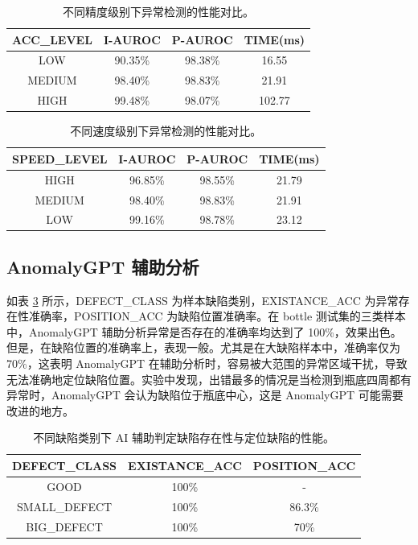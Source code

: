 \documentclass[
  ]{njuthesis}
\begin{document}
\begin{table}[H]
    \centering
    \caption{不同精度级别下异常检测的性能对比。}
    \label{acc_level_comparison}
    \renewcommand\arraystretch{0.5}
    \begin{tabular}{c|c|c|c}
    \toprule[1.5pt]
    ACC\_LEVEL & I-AUROC & P-AUROC & TIME(ms) \\
    \midrule[1pt]
    LOW & 90.35\% & 98.38\% & 16.55 \\
    \midrule[0.5pt]
    MEDIUM & 98.40\% & 98.83\% & 21.91 \\
    \midrule[0.5pt]
    HIGH & 99.48\% & 98.07\% & 102.77 \\
    \bottomrule[1.5pt]
    \end{tabular}
\end{table}

\begin{table}[H]
    \centering
    \caption{不同速度级别下异常检测的性能对比。}
    \label{speed_level_comparison}
    \renewcommand\arraystretch{0.5}
    \begin{tabular}{c|c|c|c}
    \toprule[1.5pt]
    SPEED\_LEVEL & I-AUROC & P-AUROC & TIME(ms) \\
    \midrule[1pt]
    HIGH & 96.85\% & 98.55\% & 21.79 \\
    \midrule[0.5pt]
    MEDIUM & 98.40\% & 98.83\% & 21.91 \\
    \midrule[0.5pt]
    LOW & 99.16\% & 98.78\% & 23.12 \\
    \bottomrule[1.5pt]
    \end{tabular}
\end{table}


\subsection{AnomalyGPT 辅助分析}

如表 \ref{AI_detection_accuracy} 所示，DEFECT\_CLASS 为样本缺陷类别，EXISTANCE\_ACC 为异常存在性准确率，POSITION\_ACC 为缺陷位置准确率。在 bottle 测试集的三类样本中，AnomalyGPT 辅助分析异常是否存在的准确率均达到了 100\%，效果出色。但是，在缺陷位置的准确率上，表现一般。尤其是在大缺陷样本中，准确率仅为 70\%，这表明 AnomalyGPT 在辅助分析时，容易被大范围的异常区域干扰，导致无法准确地定位缺陷位置。实验中发现，出错最多的情况是当检测到瓶底四周都有异常时，AnomalyGPT 会认为缺陷位于瓶底中心，这是 AnomalyGPT 可能需要改进的地方。

\begin{table}[H]
    \centering
    \caption{不同缺陷类别下 AI 辅助判定缺陷存在性与定位缺陷的性能。}
    \label{AI_detection_accuracy}
    \renewcommand\arraystretch{0.5}
    \begin{tabular}{c|c|c}
    \toprule[1.5pt]
    DEFECT\_CLASS & EXISTANCE\_ACC & POSITION\_ACC \\
    \midrule[1pt]
    GOOD & 100\% & - \\
    \midrule[0.5pt]
    SMALL\_DEFECT & 100\% & 86.3\% \\
    \midrule[0.5pt]
    BIG\_DEFECT & 100\% & 70\% \\
    \bottomrule[1.5pt]
    \end{tabular}
\end{table}
\end{document}
